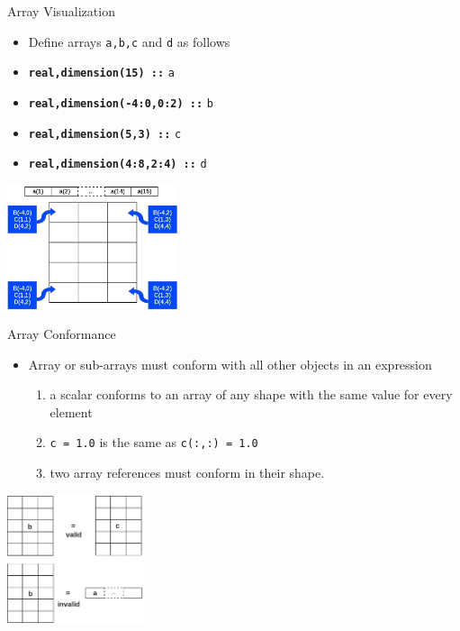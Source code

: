 \documentclass[slidestop,mathserif,compress,xcolor=svgnames]{beamer}
\begin{document}
\begin{frame}[allowframebreaks]
  \begin{block}{\scriptsize Array Visualization}
    \begin{itemize}
      \item Define arrays \texttt{a,b,c} and \texttt{d} as follows
      \item[] \textbf{\texttt{real,dimension(15) ::}} \texttt{a}
      \item[] \textbf{\texttt{real,dimension(-4:0,0:2) ::}} \texttt{b}
      \item[] \textbf{\texttt{real,dimension(5,3) ::}} \texttt{c}
      \item[] \textbf{\texttt{real,dimension(4:8,2:4) ::}} \texttt{d}
    \end{itemize}
  \end{block}
  \begin{center}
    \includegraphics[width=5cm]{./array2-3}
  \end{center}
  
  \begin{block}{\scriptsize Array Conformance}
    \begin{itemize}
      \item Array or sub-arrays must conform with all other objects in an expression
      \begin{enumerate}
        \item a scalar conforms to an array of any shape with the same value for every element
        \item[] \texttt{c = 1.0} is the same as \texttt{c(:,:) = 1.0}
        \item two array references must conform in their shape.
      \end{enumerate}
    \end{itemize}
  \end{block}
  \begin{center}
    \includegraphics[width=4cm]{./array4}
  \end{center}


\end{frame}
\end{document}
